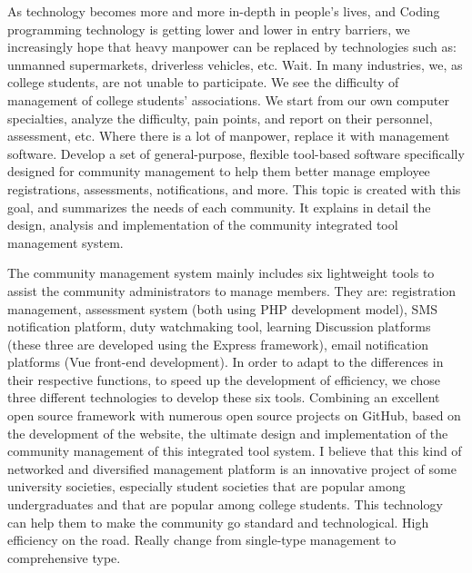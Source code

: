 \begin{eabstract} 

As technology becomes more and more in-depth in people's lives, and Coding programming technology is getting lower and lower in entry barriers, we increasingly hope that heavy manpower can be replaced by technologies such as: unmanned supermarkets, driverless vehicles, etc. Wait. In many industries, we, as college students, are not unable to participate. We see the difficulty of management of college students' associations. We start from our own computer specialties, analyze the difficulty, pain points, and report on their personnel, assessment, etc. Where there is a lot of manpower, replace it with management software. Develop a set of general-purpose, flexible tool-based software specifically designed for community management to help them better manage employee registrations, assessments, notifications, and more. This topic is created with this goal, and summarizes the needs of each community. It explains in detail the design, analysis and implementation of the community integrated tool management system.

The community management system mainly includes six lightweight tools to assist the community administrators to manage members. They are: registration management, assessment system (both using PHP development model), SMS notification platform, duty watchmaking tool, learning Discussion platforms (these three are developed using the Express framework), email notification platforms (Vue front-end development). In order to adapt to the differences in their respective functions, to speed up the development of efficiency, we chose three different technologies to develop these six tools. Combining an excellent open source framework with numerous open source projects on GitHub, based on the development of the website, the ultimate design and implementation of the community management of this integrated tool system. I believe that this kind of networked and diversified management platform is an innovative project of some university societies, especially student societies that are popular among undergraduates and that are popular among college students. This technology can help them to make the community go standard and technological. High efficiency on the road. Really change from single-type management to comprehensive type.


\end{eabstract}

